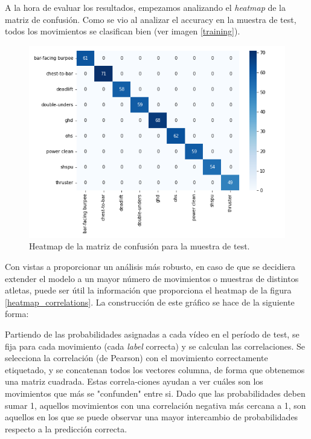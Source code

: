 A la hora de evaluar los resultados, empezamos analizando el \textit{heatmap} de la matriz de confusión. Como se vio al analizar el accuracy en la muestra de test, todos los movimientos se clasifican bien (ver imagen \ref{training}).

\begin{figure}[H]
    \centering
		\includegraphics[width=\textwidth]{figs/heatmap_confusion.png}
\caption{Heatmap de la matriz de confusión para la muestra de test.}\label{app_3}
\end{figure}

Con vistas a proporcionar un análisis más robusto, en caso de que se decidiera extender el modelo a un mayor número de movimientos o muestras de distintos atletas, puede ser útil la información que proporciona el heatmap de la figura \ref{heatmap_correlations}. La construcción de este gráfico se hace de la siguiente forma:

Partiendo de las probabilidades asignadas a cada vídeo en el período de test, se fija para cada movimiento (cada \textit{label} correcta) y se calculan las correlaciones. Se selecciona la correlación (de Pearson) con el movimiento correctamente etiquetado, y se concatenan todos los vectores columna, de forma que obtenemos una matriz cuadrada. Estas correla-ciones ayudan a ver cuáles son los movimientos que más se "confunden" entre si. Dado que las probabilidades deben sumar 1, aquellos movimientos con una correlación negativa más cercana a 1, son aquellos en los que se puede observar una mayor intercambio de probabilidades respecto a la predicción correcta.

